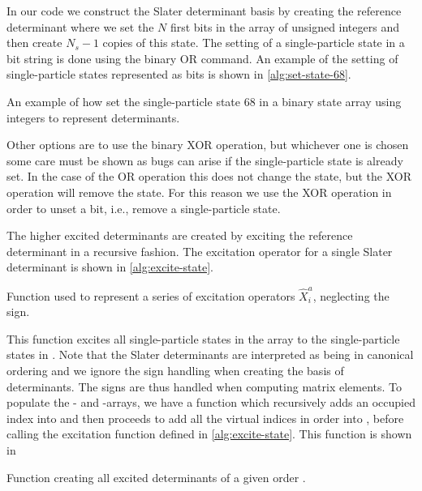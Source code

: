             In our code we construct the Slater determinant basis by creating
            the reference determinant where we set the $N$ first bits in the
            array of unsigned integers and then create $N_s - 1$ copies of this
            state.
            The setting of a single-particle state in a bit string is done using
            the binary OR command.
            An example of the setting of single-particle states represented as
            bits is shown in \autoref{alg:set-state-68}.
            \begin{algorithm}
                \caption{An example of how set the single-particle state $68$ in
                a binary state array  using 
                integers to represent determinants.}
                \label{alg:set-state-68}
            \end{algorithm}
            Other options are to use the binary XOR operation, but whichever one
            is chosen some care must be shown as bugs can arise if the
            single-particle state is already set.
            In the case of the OR operation this does not change the state, but
            the XOR operation will remove the state.
            For this reason we use the XOR operation in order to unset a bit,
            i.e., remove a single-particle state.

            The higher excited determinants are created by exciting the
            reference determinant in a recursive fashion.
            The excitation operator for a single Slater determinant is shown in
            \autoref{alg:excite-state}.
            \begin{algorithm}
                \caption{Function used to represent a series of excitation
                operators $\hat{X}^{a}_{i}$, neglecting the sign.}
                \label{alg:excite-state}
            \end{algorithm}
            This function excites all single-particle states in the array
             to the single-particle states in .
            Note that the Slater determinants are interpreted as being in
            canonical ordering and we ignore the sign handling when creating the
            basis of determinants.
            The signs are thus handled when computing matrix elements.
            To populate the - and -arrays, we have
            a function which recursively adds an occupied index into
             and then proceeds to add all the virtual indices in
            order into , before calling the excitation function
            defined in \autoref{alg:excite-state}.
            This function is shown in
            \begin{algorithm}
                \caption{Function creating all excited determinants of a given
                order .}
                \label{alg:create-excited-states}
            \end{algorithm}

